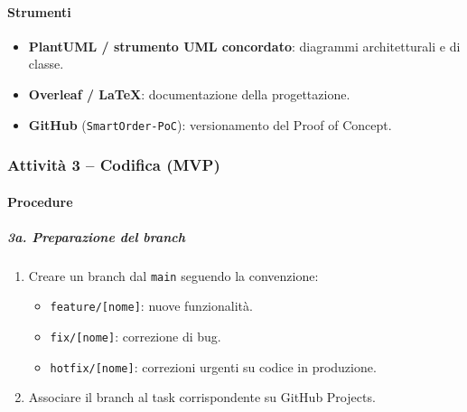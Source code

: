 \documentclass[a4paper, 11pt, oneside]{scrartcl}
\begin{document}
\paragraph{Strumenti}
\begin{itemize}
    \item \textbf{PlantUML / strumento UML concordato}: diagrammi architetturali e di classe.
    \item \textbf{Overleaf / \LaTeX{}}: documentazione della progettazione.
    \item \textbf{GitHub} (\texttt{SmartOrder-PoC}): versionamento del Proof of Concept.
\end{itemize}

\subsubsection{Attività 3 – Codifica (MVP)}

\paragraph{Procedure}

\subparagraph{3a. Preparazione del branch}
\begin{enumerate}
    \item Creare un branch dal \texttt{main} seguendo la convenzione:
          \begin{itemize}
              \item \texttt{feature/[nome]}: nuove funzionalità.
              \item \texttt{fix/[nome]}: correzione di bug.
              \item \texttt{hotfix/[nome]}: correzioni urgenti su codice in produzione.
          \end{itemize}
    \item Associare il branch al task corrispondente su GitHub Projects.
\end{enumerate}
\end{document}
